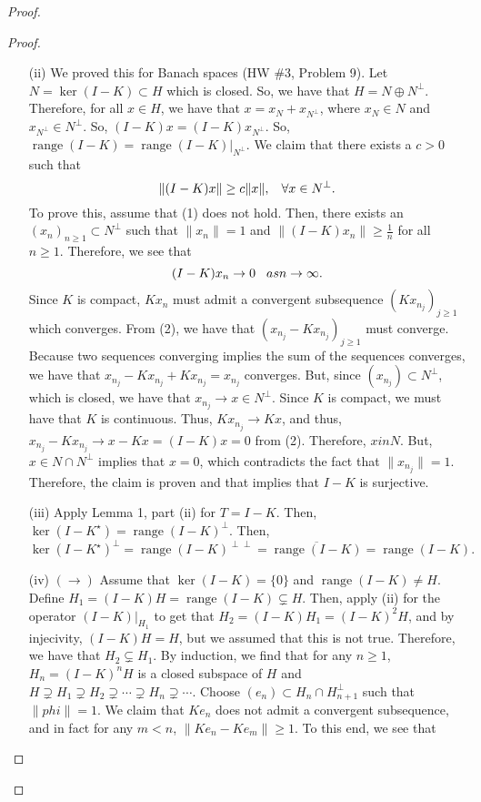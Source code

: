\documentclass[oneside]{book}
\DeclareMathOperator{\range}{range}
\newcommand{\ov}{\overline}
\newcommand{\sbs}{\subset}
\newcommand{\Ks}{K^{\star}}
\begin{document}
\begin{proof}
\begin{proof}
\begin{enumerate}
\item[(ii)] We proved this for Banach spaces (HW \#3, Problem 9). Let $N = \ker(I - K) \sbs H$ which is closed. So, we have that $H = N \oplus N^{\perp}$. Therefore, for all $x \in H$, we have that $x = x_N + x_{N^{\perp}}$, where $x_N \in N$ and $x_{N^{\perp}} \in N^{\perp}$. So, $(I - K)x = (I - K) x_{N^{\perp}}$. So, $\range(I - K) = \range(I - K) \vert_{N^{\perp}}$. We claim that there exists a $c > 0$ such that 
\begin{equation}
\| (I - K) x \| \geq c \| x \|, \hspace{3mm} \forall x\in N^{\perp}.
\end{equation} 
To prove this, assume that (1) does not hold. Then, there exists an $(x_n)_{n \geq 1} \sbs N^{\perp}$ such that $\| x_n \| = 1$ and $\| (I - K) x_n \| \geq \frac{1}{n}$ for all $n \geq 1$. Therefore, we see that 
\begin{equation}
(I - K) x_n \to 0 \hspace{3mm} as n \to \infty.
\end{equation} 
Since $K$ is compact, $Kx_n$ must admit a convergent subsequence $(Kx_{n_j})_{ j \geq 1}$ which converges. From (2), we have that $(x_{n_j} - K x_{n_j})_{j \geq 1}$ must converge. Because two sequences converging implies the sum of the sequences converges, we have that $x_{n_j} - Kx_{n_j} +K x_{n_j} = x_{n_j}$ converges. But, since $(x_{n_j}) \sbs N^{\perp}$, which is closed, we have that $x_{n_j} \to x \in N^{\perp}$. Since $K$ is compact, we must have that $K$ is continuous. Thus, $Kx_{n_j} \to Kx$, and thus, $x_{n_j} - Kx_{n_j} \to x - Kx = (I- K) x = 0$ from (2). Therefore, $x in N$. But, $x \in N \cap N^{\perp}$ implies that $x = 0$, which contradicts the fact that $\| x_{n_j} \| = 1$. Therefore, the claim is proven and that implies that $I - K$ is surjective. 
\item[(iii)] Apply Lemma 1, part (ii) for $T = I - K$. Then, $\ker(I - \Ks) = \range(I - K)^{\perp}$. Then, 
\[ \ker(I - \Ks)^{\perp} = \range(I - K)^{\perp \perp} = \ov{\range(I - K)} = \range(I - K). \]
\item[(iv)] $(\rightarrow)$ Assume that $\ker(I - K) = \{ 0 \}$ and $\range(I - K) \neq H$. Define $H_1 = (I - K)H = \range(I - K) \subsetneq H$. Then, apply (ii) for the operator $(I - K) \vert_{H_1}$ to get that $H_2 = (I - K) H_1 = (I - K)^2 H$, and by injecivity, $(I - K) H = H$, but we assumed that this is not true. Therefore, we have that $H_2 \subsetneq H_1$. By induction, we find that for any $n \geq 1$, $H_n = (I - K)^n H$ is a closed subspace of $H$ and $H \supsetneq H_1 \supsetneq H_2 \supsetneq \cdots \supsetneq H_n \supsetneq \cdots$. Choose $(e_n) \sbs H_n \cap H_{n + 1}^{\perp}$ such that $\| phi \| = 1$. We claim that $Ke_n$ does not admit a convergent subsequence, and in fact for any $m < n$, $\| K e_n - K e_m \| \geq 1$. To this end, we see that 

\end{enumerate}
\end{proof}
\end{proof}
\end{document}
